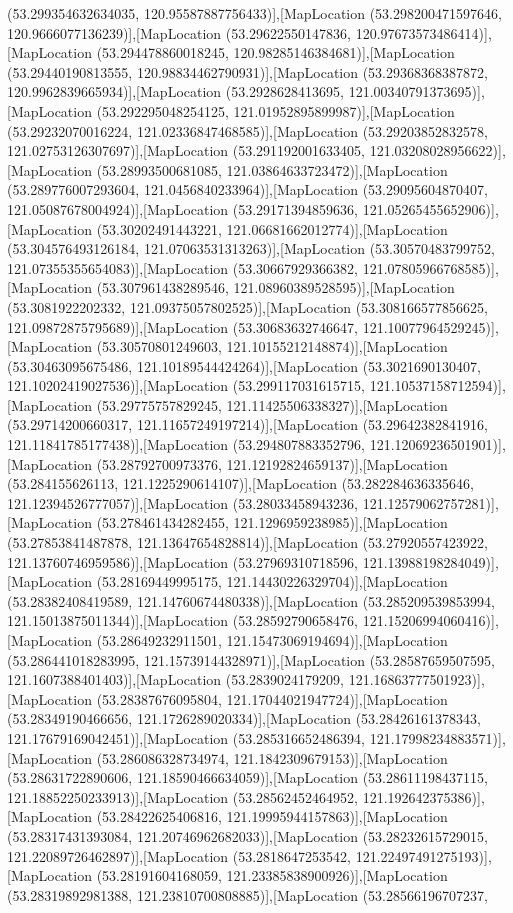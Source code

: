 (53.299354632634035, 120.95587887756433)],[MapLocation (53.298200471597646, 120.9666077136239)],[MapLocation (53.29622550147836, 120.97673573486414)],[MapLocation (53.294478860018245, 120.98285146384681)],[MapLocation (53.29440190813555, 120.98834462790931)],[MapLocation (53.29368368387872, 120.9962839665934)],[MapLocation (53.2928628413695, 121.00340791373695)],[MapLocation (53.292295048254125, 121.01952895899987)],[MapLocation (53.29232070016224, 121.02336847468585)],[MapLocation (53.29203852832578, 121.02753126307697)],[MapLocation (53.291192001633405, 121.03208028956622)],[MapLocation (53.28993500681085, 121.03864633723472)],[MapLocation (53.289776007293604, 121.0456840233964)],[MapLocation (53.29095604870407, 121.05087678004924)],[MapLocation (53.29171394859636, 121.05265455652906)],[MapLocation (53.30202491443221, 121.06681662012774)],[MapLocation (53.304576493126184, 121.07063531313263)],[MapLocation (53.30570483799752, 121.07355355654083)],[MapLocation (53.30667929366382, 121.07805966768585)],[MapLocation (53.307961438289546, 121.08960389528595)],[MapLocation (53.3081922202332, 121.09375057802525)],[MapLocation (53.308166577856625, 121.09872875795689)],[MapLocation (53.30683632746647, 121.10077964529245)],[MapLocation (53.30570801249603, 121.10155212148874)],[MapLocation (53.30463095675486, 121.10189544424264)],[MapLocation (53.3021690130407, 121.10202419027536)],[MapLocation (53.299117031615715, 121.10537158712594)],[MapLocation (53.29775757829245, 121.11425506338327)],[MapLocation (53.29714200660317, 121.11657249197214)],[MapLocation (53.29642382841916, 121.11841785177438)],[MapLocation (53.294807883352796, 121.12069236501901)],[MapLocation (53.28792700973376, 121.12192824659137)],[MapLocation (53.284155626113, 121.1225290614107)],[MapLocation (53.282284636335646, 121.12394526777057)],[MapLocation (53.28033458943236, 121.12579062757281)],[MapLocation (53.278461434282455, 121.1296959238985)],[MapLocation (53.27853841487878, 121.13647654828814)],[MapLocation (53.27920557423922, 121.13760746959586)],[MapLocation (53.27969310718596, 121.13988198284049)],[MapLocation (53.28169449995175, 121.14430226329704)],[MapLocation (53.28382408419589, 121.14760674480338)],[MapLocation (53.285209539853994, 121.15013875011344)],[MapLocation (53.28592790658476, 121.15206994060416)],[MapLocation (53.28649232911501, 121.15473069194694)],[MapLocation (53.286441018283995, 121.15739144328971)],[MapLocation (53.28587659507595, 121.1607388401403)],[MapLocation (53.2839024179209, 121.16863777501923)],[MapLocation (53.28387676095804, 121.17044021947724)],[MapLocation (53.28349190466656, 121.1726289020334)],[MapLocation (53.28426161378343, 121.17679169042451)],[MapLocation (53.285316652486394, 121.17998234883571)],[MapLocation (53.286086328734974, 121.1842309679153)],[MapLocation (53.28631722890606, 121.18590466634059)],[MapLocation (53.28611198437115, 121.18852250233913)],[MapLocation (53.28562452464952, 121.192642375386)],[MapLocation (53.28422625406816, 121.19995944157863)],[MapLocation (53.28317431393084, 121.20746962682033)],[MapLocation (53.28232615729015, 121.22089726462897)],[MapLocation (53.2818647253542, 121.22497491275193)],[MapLocation (53.28191604168059, 121.23385838900926)],[MapLocation (53.28319892981388, 121.23810700808885)],[MapLocation (53.28566196707237, 